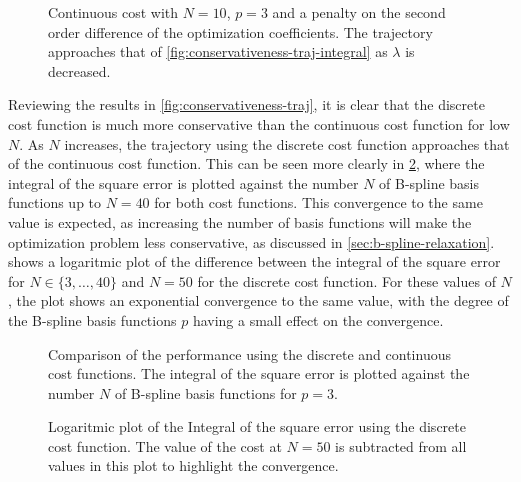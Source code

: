 \begin{figure}
    \centering
    
    \caption{Continuous cost with $N=10$, $p=3$ and a penalty on the second order difference of the optimization coefficients. The trajectory approaches that of \cref{fig:conservativeness-traj-integral} as $\lambda$ is decreased.}\label{fig:conservativeness-oscillation-damping}
\end{figure}


Reviewing the results in \cref{fig:conservativeness-traj}, it is clear that the discrete cost function is much more conservative than the continuous cost function for low $N$. As $N$ increases, the trajectory using the discrete cost function approaches that of the continuous cost function. This can be seen more clearly in \cref{fig:conservativeness}, where the integral of the square error is plotted against the number $N$ of B-spline basis functions up to $N=40$ for both cost functions. This convergence to the same value is expected, as increasing the number of basis functions will make the optimization problem less conservative, as discussed in \cref{sec:b-spline-relaxation}.  shows a logaritmic plot of the difference between the integral of the square error for $N\in\{3,\ldots,40\}$ and $N=50$ for the discrete cost function. For these values of $N$, the plot shows an exponential convergence to the same value, with the degree of the B-spline basis functions $p$ having a small effect on the convergence.

\begin{figure}
    \centering
    
    \caption{Comparison of the performance using the discrete and continuous cost functions. The integral of the square error is plotted against the number $N$ of B-spline basis functions for $p=3$.}
    \label{fig:conservativeness}
\end{figure}


\begin{figure}
    \centering
    
    \caption{Logaritmic plot of the Integral of the square error using the discrete cost function. The value of the cost at $N=50$ is subtracted from all values in this plot to highlight the convergence.}
    \label{fig:conservativeness-coeffs}
\end{figure}

